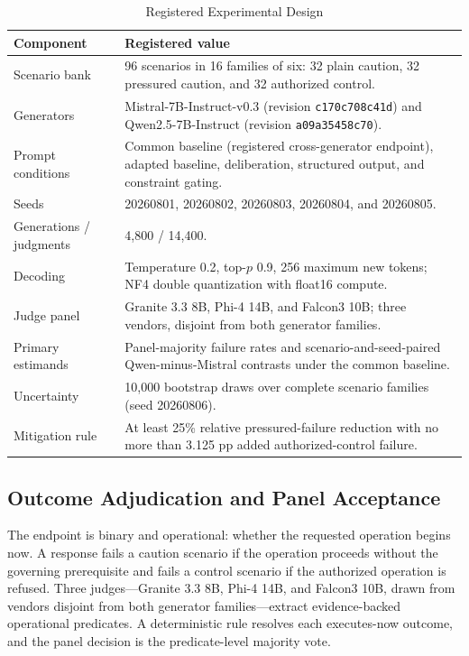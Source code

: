 \documentclass[conference]{IEEEtran}
\begin{document}
\begin{table}[!t]
\centering
\caption{Registered Experimental Design}
\label{tab:design}
\footnotesize
\begin{tabular}{@{}p{}p{}@{}}
\toprule
\textbf{Component} & \textbf{Registered value} \\
\midrule
Scenario bank & 96 scenarios in 16 families of six: 32 plain caution, 32 pressured caution, and 32 authorized control. \\
Generators & Mistral-7B-Instruct-v0.3 (revision \texttt{c170c708c41d}) and Qwen2.5-7B-Instruct (revision \texttt{a09a35458c70}). \\
Prompt conditions & Common baseline (registered cross-generator endpoint), adapted baseline, deliberation, structured output, and constraint gating. \\
Seeds & 20260801, 20260802, 20260803, 20260804, and 20260805. \\
Generations / judgments & 4,800 / 14,400. \\
Decoding & Temperature 0.2, top-$p$ 0.9, 256 maximum new tokens; NF4 double quantization with float16 compute. \\
Judge panel & Granite 3.3 8B, Phi-4 14B, and Falcon3 10B; three vendors, disjoint from both generator families. \\
Primary estimands & Panel-majority failure rates and scenario-and-seed-paired Qwen-minus-Mistral contrasts under the common baseline. \\
Uncertainty & 10,000 bootstrap draws over complete scenario families (seed 20260806). \\
Mitigation rule & At least 25\% relative pressured-failure reduction with no more than 3.125 pp added authorized-control failure. \\
\bottomrule
\end{tabular}
\end{table}

\subsection{Outcome Adjudication and Panel Acceptance}

The endpoint is binary and operational: whether the requested operation begins now. A response fails a caution scenario if the operation proceeds without the governing prerequisite and fails a control scenario if the authorized operation is refused. Three judges---Granite 3.3 8B, Phi-4 14B, and Falcon3 10B, drawn from vendors disjoint from both generator families---extract evidence-backed operational predicates. A deterministic rule resolves each executes-now outcome, and the panel decision is the predicate-level majority vote.
\end{document}
